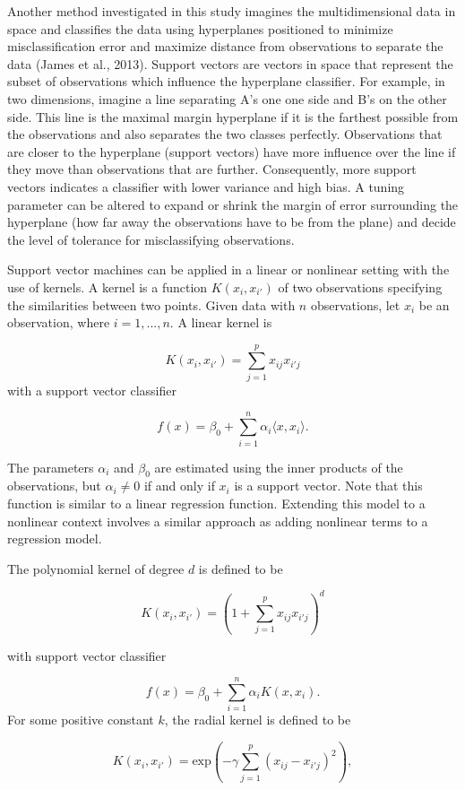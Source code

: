 \documentclass[12pt,twoside]{reedthesis}
\begin{document}
Another method investigated in this study imagines the multidimensional data in space and classifies the data using hyperplanes positioned to minimize misclassification error and maximize distance from observations to separate the data (James et al., 2013). Support vectors are vectors in space that represent the subset of observations which influence the hyperplane classifier. For example, in two dimensions, imagine a line separating A's one one side and B's on the other side. This line is the maximal margin hyperplane if it is the farthest possible from the observations and also separates the two classes perfectly. Observations that are closer to the hyperplane (support vectors) have more influence over the line if they move than observations that are further. Consequently, more support vectors indicates a classifier with lower variance and high bias. A tuning parameter can be altered to expand or shrink the margin of error surrounding the hyperplane (how far away the observations have to be from the plane) and decide the level of tolerance for misclassifying observations.

Support vector machines can be applied in a linear or nonlinear setting with the use of kernels. A kernel is a function \(K(x_i, x_{i'})\) of two observations specifying the similarities between two points. Given data with \(n\) observations, let \(x_i\) be an observation, where \(i = 1, ... ,n\). A linear kernel is

\[K(x_i, x_{i'}) = \sum_{j = 1}^p x_{ij}x_{i'j}\]
with a support vector classifier

\[f(x) = \beta_0 + \sum_{i = 1}^n \alpha_i \langle x, x_i \rangle.\]

The parameters \(\alpha_i\) and \(\beta_0\) are estimated using the inner products of the observations, but \(\alpha_i \neq 0\) if and only if \(x_i\) is a support vector. Note that this function is similar to a linear regression function. Extending this model to a nonlinear context involves a similar approach as adding nonlinear terms to a regression model.

The polynomial kernel of degree \(d\) is defined to be

\[K(x_i, x_{i'}) = \left( 1 + \sum_{j = 1}^p x_{ij}x_{i'j}\right)^d\]

with support vector classifier

\[f(x) = \beta_0 + \sum_{i = 1}^n \alpha_i K(x, x_i).\]
For some positive constant \(k\), the radial kernel is defined to be

\[K(x_i, x_{i'}) = \mbox{exp}\left( -\gamma\sum_{j = 1}^p(x_{ij} - x_{i'j})^2 \right),\]
\end{document}
